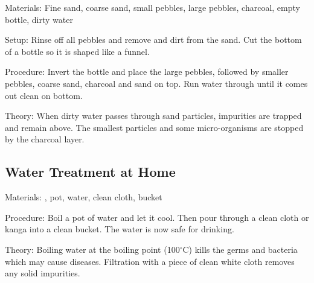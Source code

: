 \begin{multicols}{2}
\begin{description*}
\item[Materials:]{Fine sand, coarse sand, small pebbles, large pebbles, charcoal, empty bottle, dirty water}
\item[Setup:]{Rinse off all pebbles and remove and dirt from the sand. Cut the bottom of a bottle so it is shaped like a funnel.}
\item[Procedure:]{Invert the bottle and place the large pebbles, followed by smaller pebbles, coarse sand, charcoal and sand on top. Run water through until it comes out clean on bottom.}
\item[Theory:]{When dirty water passes through sand particles, impurities are trapped and
remain above. The smallest particles and some micro-organisms are stopped
by the charcoal layer.}
\end{description*}

\subsection{Water Treatment at Home}


\begin{description*}
\item[Materials:]{, pot, water, clean cloth, bucket}
\item[Procedure:]{Boil a pot of water and let it cool. Then pour through a clean cloth or kanga into a clean bucket. The water is now safe for drinking.}
\item[Theory:]{Boiling water at the boiling point (100$^\circ$C) kills the germs and
bacteria which may cause diseases. Filtration with a piece of clean white
cloth removes any solid impurities.}
\end{description*}


\end{multicols}
